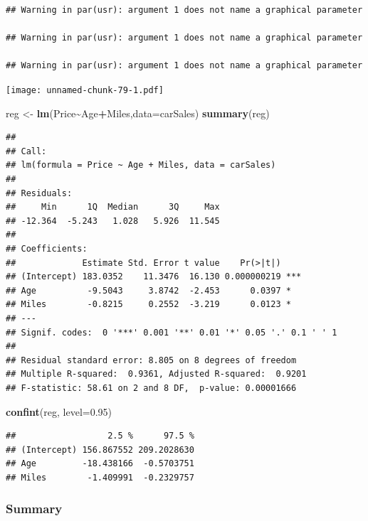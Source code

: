 \documentclass[
]{article}
\newenvironment{Shaded}{\begin{snugshade}}{\end{snugshade}}
\newcommand{\AttributeTok}[1]{\textcolor[rgb]{0.13,0.29,0.53}{#1}}
\newcommand{\FloatTok}[1]{\textcolor[rgb]{0.00,0.00,0.81}{#1}}
\newcommand{\FunctionTok}[1]{\textcolor[rgb]{0.13,0.29,0.53}{\textbf{#1}}}
\newcommand{\NormalTok}[1]{#1}
\newcommand{\OtherTok}[1]{\textcolor[rgb]{0.56,0.35,0.01}{#1}}
\newcommand{\SpecialCharTok}[1]{\textcolor[rgb]{0.81,0.36,0.00}{\textbf{#1}}}
\begin{document}
\begin{verbatim}
## Warning in par(usr): argument 1 does not name a graphical parameter

## Warning in par(usr): argument 1 does not name a graphical parameter

## Warning in par(usr): argument 1 does not name a graphical parameter
\end{verbatim}

\texttt{[image: unnamed-chunk-79-1.pdf]}

\begin{Shaded}
\begin{Highlighting}[]
\NormalTok{reg }\OtherTok{\textless{}{-}} \FunctionTok{lm}\NormalTok{(Price}\SpecialCharTok{\textasciitilde{}}\NormalTok{Age}\SpecialCharTok{+}\NormalTok{Miles,}\AttributeTok{data=}\NormalTok{carSales)}
\FunctionTok{summary}\NormalTok{(reg)}
\end{Highlighting}
\end{Shaded}

\begin{verbatim}
## 
## Call:
## lm(formula = Price ~ Age + Miles, data = carSales)
## 
## Residuals:
##     Min      1Q  Median      3Q     Max 
## -12.364  -5.243   1.028   5.926  11.545 
## 
## Coefficients:
##             Estimate Std. Error t value    Pr(>|t|)    
## (Intercept) 183.0352    11.3476  16.130 0.000000219 ***
## Age          -9.5043     3.8742  -2.453      0.0397 *  
## Miles        -0.8215     0.2552  -3.219      0.0123 *  
## ---
## Signif. codes:  0 '***' 0.001 '**' 0.01 '*' 0.05 '.' 0.1 ' ' 1
## 
## Residual standard error: 8.805 on 8 degrees of freedom
## Multiple R-squared:  0.9361, Adjusted R-squared:  0.9201 
## F-statistic: 58.61 on 2 and 8 DF,  p-value: 0.00001666
\end{verbatim}

\begin{Shaded}
\begin{Highlighting}[]
\FunctionTok{confint}\NormalTok{(reg, }\AttributeTok{level=}\FloatTok{0.95}\NormalTok{)}
\end{Highlighting}
\end{Shaded}

\begin{verbatim}
##                  2.5 %      97.5 %
## (Intercept) 156.867552 209.2028630
## Age         -18.438166  -0.5703751
## Miles        -1.409991  -0.2329757
\end{verbatim}

\hypertarget{summary}{%
\subsubsection{Summary}\label{summary}}
\end{document}
